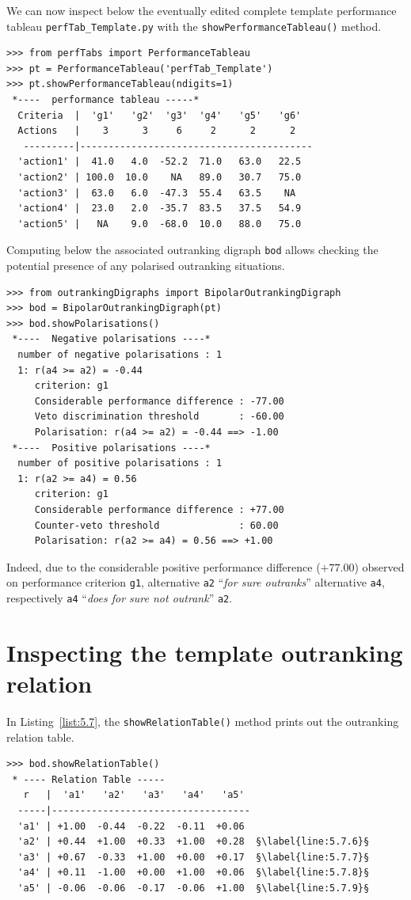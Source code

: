 We can now inspect below the eventually edited complete template performance tableau \texttt{perfTab\_Template.py} with the \texttt{showPerformanceTableau()} method.
\begin{lstlisting}
>>> from perfTabs import PerformanceTableau   
>>> pt = PerformanceTableau('perfTab_Template')
>>> pt.showPerformanceTableau(ndigits=1)
 *----  performance tableau -----*
  Criteria  |  'g1'   'g2'  'g3'  'g4'   'g5'   'g6'   
  Actions   |    3      3     6     2      2      2    
   ---------|-----------------------------------------
  'action1' |  41.0   4.0  -52.2  71.0   63.0   22.5  
  'action2' | 100.0  10.0    NA   89.0   30.7   75.0  
  'action3' |  63.0   6.0  -47.3  55.4   63.5    NA   
  'action4' |  23.0   2.0  -35.7  83.5   37.5   54.9  
  'action5' |   NA    9.0  -68.0  10.0   88.0   75.0
\end{lstlisting}

Computing below the associated outranking digraph \texttt{bod} allows checking the potential presence of any polarised outranking situations.
\begin{lstlisting}
>>> from outrankingDigraphs import BipolarOutrankingDigraph
>>> bod = BipolarOutrankingDigraph(pt)
>>> bod.showPolarisations()
 *----  Negative polarisations ----*
  number of negative polarisations : 1 
  1: r(a4 >= a2) = -0.44
     criterion: g1
     Considerable performance difference : -77.00
     Veto discrimination threshold       : -60.00
     Polarisation: r(a4 >= a2) = -0.44 ==> -1.00
 *----  Positive polarisations ----*
  number of positive polarisations : 1 
  1: r(a2 >= a4) = 0.56
     criterion: g1
     Considerable performance difference : +77.00
     Counter-veto threshold              : 60.00
     Polarisation: r(a2 >= a4) = 0.56 ==> +1.00
\end{lstlisting}

Indeed, due to the considerable positive performance difference ($+77.00$) observed on performance criterion \texttt{g1}, alternative \texttt{a2} ``\emph{for sure outranks}'' alternative \texttt{a4}, respectively \texttt{a4} ``\emph{does for sure not outrank}'' \texttt{a2}.

\section{Inspecting the template outranking relation}
\label{sec:5.6}

In Listing~\vref{list:5.7}, the \texttt{showRelationTable()} method prints out the outranking relation table.
\begin{lstlisting}[caption={The template outranking relation},label=list:5.7]
>>> bod.showRelationTable()
 * ---- Relation Table -----
   r   |  'a1'   'a2'   'a3'   'a4'   'a5'   
  -----|-----------------------------------
  'a1' | +1.00  -0.44  -0.22  -0.11  +0.06  
  'a2' | +0.44  +1.00  +0.33  +1.00  +0.28  §\label{line:5.7.6}§
  'a3' | +0.67  -0.33  +1.00  +0.00  +0.17  §\label{line:5.7.7}§
  'a4' | +0.11  -1.00  +0.00  +1.00  +0.06  §\label{line:5.7.8}§
  'a5' | -0.06  -0.06  -0.17  -0.06  +1.00  §\label{line:5.7.9}§
\end{lstlisting}

